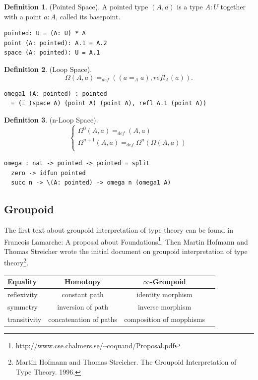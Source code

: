 \documentclass{article}
\theoremstyle{definition}
\newtheorem{definition}{Definition}
\begin{document}
\begin{definition} (Pointed Space). A pointed type $(A,a)$ is a type $A:U$
together with a point $a:A$, called its basepoint.
\begin{lstlisting}
pointed: U = (A: U) * A
point (A: pointed): A.1 = A.2
space (A: pointed): U = A.1
\end{lstlisting}
\end{definition}

\begin{definition} (Loop Space).
$$\Omega(A,a) =_{def} ((a =_A a), refl_A(a)).$$
\begin{lstlisting}
omega1 (A: pointed) : pointed
  = (Ξ (space A) (point A) (point A), refl A.1 (point A))
\end{lstlisting}
\end{definition}

\begin{definition} (n-Loop Space).
$$
\begin{cases}
\Omega^0(A, a) =_{def} (A, a)\\
\Omega^{n+1}(A,a) =_{def} \Omega^{n}(\Omega(A,a))\\
\end{cases}
$$
\begin{lstlisting}
omega : nat -> pointed -> pointed = split
  zero -> idfun pointed
  succ n -> \(A: pointed) -> omega n (omega1 A)
\end{lstlisting}
\end{definition}

\newpage
\subsection{Groupoid}
The first text about groupoid interpretation of type theory can be found in Francois Lamarche:
A proposal about Foundations\footnote{\url{http://www.cse.chalmers.se/~coquand/Proposal.pdf}}.
Then Martin Hofmann and Thomas Streicher wrote the initial
document on groupoid interpretation of type
theory\footnote{Martin Hofmann and Thomas Streicher. The Groupoid Interpretation of Type Theory. 1996.}.

\begin{table}[H]
\begin{center}
\begin{tabular}{lccc}
\hline
{\bf Equality} & {\bf Homotopy} & {\bf $\infty$-Groupoid} \\
\hline
reflexivity  & constant path & identity morphism \\
symmetry     & inversion of path & inverse morphism \\
transitivity & concatenation of paths & composition of mopphisms \\
\hline
\end{tabular}
\end{center}
\end{table}
\end{document}

